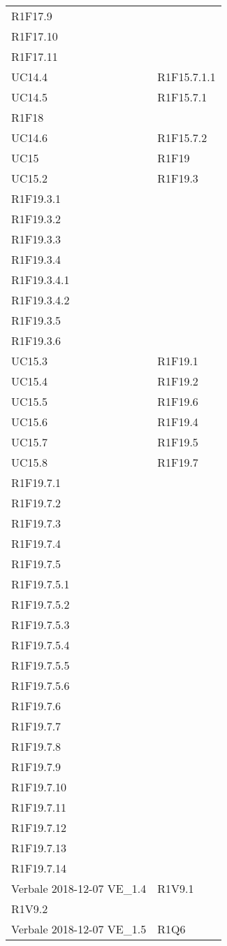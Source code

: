 \begin{longtable}{ >{\centering}p{}
			>{\centering}p{}}
		R1F17.9\\
		R1F17.10\\
		R1F17.11	\tabularnewline
		UC14.4	&	R1F15.7.1.1	\tabularnewline
		UC14.5	&	R1F15.7.1\\
		R1F18	\tabularnewline
		UC14.6	&	R1F15.7.2	\tabularnewline
		UC15	&	R1F19	\tabularnewline
		UC15.2	&	R1F19.3\\
		R1F19.3.1\\
		R1F19.3.2\\
		R1F19.3.3\\
		R1F19.3.4\\
		R1F19.3.4.1\\
		R1F19.3.4.2\\
		R1F19.3.5\\
		R1F19.3.6	\tabularnewline
		UC15.3	&	R1F19.1	\tabularnewline
		UC15.4	&	R1F19.2	\tabularnewline
		UC15.5	&	R1F19.6	\tabularnewline
		UC15.6	&	R1F19.4	\tabularnewline
		UC15.7	&	R1F19.5	\tabularnewline
		UC15.8	&	R1F19.7\\
		R1F19.7.1\\
		R1F19.7.2\\
		R1F19.7.3\\
		R1F19.7.4\\
		R1F19.7.5\\
		R1F19.7.5.1\\
		R1F19.7.5.2\\
		R1F19.7.5.3\\
		R1F19.7.5.4\\
		R1F19.7.5.5\\
		R1F19.7.5.6\\
		R1F19.7.6\\
		R1F19.7.7\\
		R1F19.7.8\\
		R1F19.7.9\\
		R1F19.7.10\\
		R1F19.7.11\\
		R1F19.7.12\\
		R1F19.7.13\\
		R1F19.7.14	\tabularnewline
		Verbale 2018-12-07 VE\_1.4	&	R1V9.1\\
		R1V9.2	\tabularnewline
		Verbale 2018-12-07 VE\_1.5	&	R1Q6	\tabularnewline
	
	\end{longtable}
